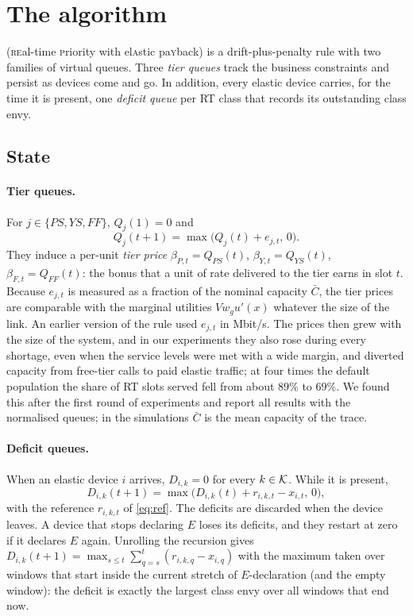 \section{The \repay{} algorithm}\label{sec:algorithm}

\repay{} (\textsc{re}al-time \textsc{p}riority with el\textsc{a}stic pa\textsc{y}back) is a drift-plus-penalty rule with two families of virtual queues.
Three \emph{tier queues} track the business constraints and persist as devices come and go.
In addition, every elastic device carries, for the time it is present, one \emph{deficit queue} per RT class that records its outstanding class envy.

\subsection{State}

\paragraph{Tier queues.}
For $j\in\{PS,YS,FF\}$, $Q_j(1)=0$ and
\begin{equation}\label{eq:Q}
Q_j(t+1)=\max\big(Q_j(t)+e_{j,t},\,0\big).
\end{equation}
They induce a per-unit \emph{tier price} $\beta_{P,t}=Q_{PS}(t)$, $\beta_{Y,t}=Q_{YS}(t)$, $\beta_{F,t}=Q_{FF}(t)$: the bonus that a unit of rate delivered to the tier earns in slot $t$.
Because $e_{j,t}$ is measured as a fraction of the nominal capacity $\bar C$, the tier prices are comparable with the marginal utilities $Vw_gu'(x)$ whatever the size of the link.
An earlier version of the rule used $e_{j,t}$ in Mbit/s. The prices then grew with the size of the system, and in our experiments they also rose during every shortage, even when the service levels were met with a wide margin, and diverted capacity from free-tier calls to paid elastic traffic; at four times the default population the share of RT slots served fell from about $89\%$ to $69\%$. We found this after the first round of experiments and report all results with the normalised queues; in the simulations $\bar C$ is the mean capacity of the trace.

\paragraph{Deficit queues.}
When an elastic device $i$ arrives, $D_{i,k}=0$ for every $k\in\mathcal{K}$. While it is present,
\begin{equation}\label{eq:D}
D_{i,k}(t+1)=\max\big(D_{i,k}(t)+r_{i,k,t}-x_{i,t},\,0\big),
\end{equation}
with the reference $r_{i,k,t}$ of \eqref{eq:ref}. The deficits are discarded when the device leaves.
A device that stops declaring $E$ loses its deficits, and they restart at zero if it declares $E$ again.
Unrolling the recursion gives $D_{i,k}(t+1)=\max_{s\le t}\sum_{q=s}^{t}(r_{i,k,q}-x_{i,q})$ with the maximum taken over windows that start inside the current stretch of $E$-declaration (and the empty window): the deficit is exactly the largest class envy over all windows that end now.

